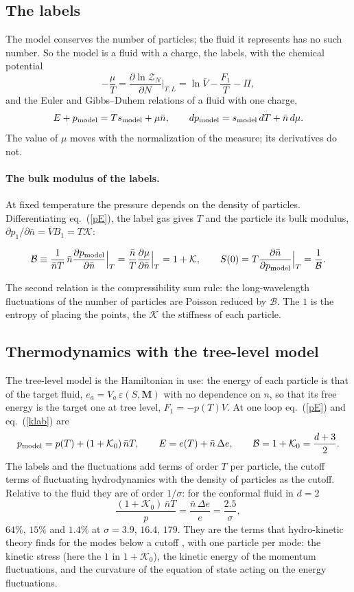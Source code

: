 \documentclass[11pt,aps,preprint,nofootinbib,superscriptaddress,tightenlines]{revtex4-2}
\newcommand{\klab}{\mathcal B}
\def\st{\begin{equation}}
\def\stp{\end{equation}}
\def\Eq#1{eq.~(\ref{#1})}
\let\oldparagraph\paragraph
\renewcommand{\paragraph}{\par\bigskip\oldparagraph}
\begin{document}
\subsection{The labels}
\label{sec:labels}

The model conserves the number of particles; the fluid it represents has no such number.  So the model is a fluid with a charge, the labels, with the chemical
potential
\st
-\frac\mu T=\frac{\partial\ln\mathcal Z_N}{\partial N}\Big|_{T,L}=\ln\bar V-\frac{F_1}T-\Pi ,
\label{mu}
\stp
and the Euler and Gibbs--Duhem relations of a fluid with one charge,
\st
E+p_{\rm model}=Ts_{\rm model}+\mu\bar n,\qquad dp_{\rm model}=s_{\rm model}\,dT+\bar n\,d\mu .
\label{GD}
\stp
The value of $\mu$ moves with the normalization of the measure; its derivatives do not.

\paragraph{The bulk modulus of the labels.}  At fixed temperature the pressure depends on the density of particles.  Differentiating \Eq{pE}, the label gas gives $T$
and the particle its bulk modulus, $\partial p_1/\partial\bar n=\bar VB_1=T\mathcal K$:
\begin{keyeq}
\st
\klab\equiv\frac1{\bar nT}\,\bar n\frac{\partial p_{\rm model}}{\partial\bar n}\Big|_T=\frac{\bar n}T\frac{\partial\mu}{\partial\bar n}\Big|_T=1+\mathcal K,\qquad
S(0)=T\frac{\partial\bar n}{\partial p_{\rm model}}\Big|_T=\frac1{\klab} .
\label{klab}
\stp
\end{keyeq}
The second relation is the compressibility sum rule: the long-wavelength fluctuations of the number of particles are Poisson reduced by $\klab$.  The $1$ is the
entropy of placing the points, the $\mathcal K$ the stiffness of each particle.

\subsection{Thermodynamics with the tree-level model}
\label{sec:present}

The tree-level model is the Hamiltonian in use: the energy of each particle is that of the target fluid, $e_a=V_a\,\varepsilon(S,\bm M)$ with no dependence on
$n$, so that its free energy is the target one at tree level, $F_1=-p(T)V$.  At one loop \Eq{pE} and \Eq{klab} are
\st
p_{\rm model}=p(T)+(1+\mathcal K_0)\,\bar nT,\qquad E=e(T)+\bar n\,\Delta e,\qquad \klab=1+\mathcal K_0=\frac{d+3}2 .
\label{present}
\stp
The labels and the fluctuations add terms of order $T$ per particle, the cutoff terms of fluctuating hydrodynamics with the density of particles as the
cutoff.  Relative to the fluid they are of order $1/\sigma$: for the conformal fluid in $d=2$
\st
\frac{(1+\mathcal K_0)\,\bar nT}p=\frac{\bar n\,\Delta e}e=\frac{2.5}\sigma ,
\stp
$64\%$, $15\%$ and $1.4\%$ at $\sigma=3.9$, $16.4$, $179$.  They are the terms that hydro-kinetic theory finds for the modes below a cutoff \cite{amt}, with one
particle per mode: the kinetic stress (here the $1$ in $1+\mathcal K_0$), the kinetic energy of the momentum fluctuations, and the curvature of the equation of
state acting on the energy fluctuations.
\end{document}
